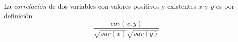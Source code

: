 La \emph{correlación} de dos variables con valores positivos y existentes $x$ y $y$ es por definición
\begin{equation}
\frac{cov(x,y)}{\sqrt{var(x)}\sqrt{var(y)}}
\end{equation}